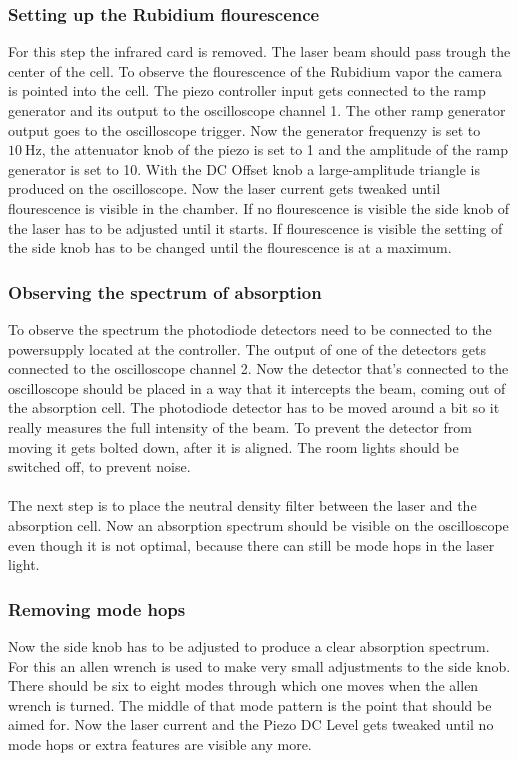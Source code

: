 \subsubsection{Setting up the Rubidium flourescence}
\label{sec:flourescence}
For this step the infrared card is removed.
The laser beam should pass trough the center of the cell.
To observe the flourescence of the Rubidium vapor the camera is pointed into the cell.
The piezo controller input gets connected to the ramp generator and its output to the oscilloscope channel 1.
The other ramp generator output goes to the oscilloscope trigger.
Now the generator frequenzy is set to $\SI{10}{\Hz}$, the attenuator knob of the piezo is set to 1 and the amplitude of the ramp generator is set to 10.
With the DC Offset knob a large-amplitude triangle is produced on the oscilloscope.
Now the laser current gets tweaked until flourescence is visible in the chamber.
If no flourescence is visible the side knob of the laser has to be adjusted until it starts.
If flourescence is visible the setting of the side knob has to be changed until the flourescence is at a maximum.

\subsubsection{Observing the spectrum of absorption}
To observe the spectrum the photodiode detectors need to be connected to the powersupply located at the controller.
The output of one of the detectors gets connected to the oscilloscope channel 2.
Now the detector that's connected to the oscilloscope should be placed in a way that it intercepts the beam, coming out of the absorption cell.
The photodiode detector has to be moved around a bit so it really measures the full intensity of the beam.
To prevent the detector from moving it gets bolted down, after it is aligned.
The room lights should be switched off, to prevent noise.
\\\\
The next step is to place the neutral density filter between the laser and the absorption cell.
Now an absorption spectrum should be visible on the oscilloscope even though it is not optimal, because there can still be mode hops in the laser light.

\subsubsection{Removing mode hops}
Now the side knob has to be adjusted to produce a clear absorption spectrum.
For this an allen wrench is used to make very small adjustments to the side knob.
There should be six to eight modes through which one moves when the allen wrench is turned.
The middle of that mode pattern is the point that should be aimed for.
Now the laser current and the Piezo DC Level gets tweaked until no mode hops or extra features are visible any more.

